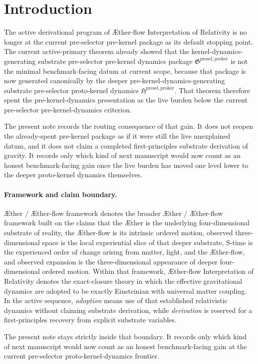 \documentclass[11pt]{article}
\newcommand{\Aether}{\AE{}ther}
\newcommand{\Aflow}{\AE{}ther-flow}
\newcommand{\TheoryName}{\Aflow{} Interpretation of Relativity}
\newcommand{\TheoryProgram}{\Aether{} / \Aflow{} framework}
\newcommand{\ProtoKernelPackage}{\mathfrak H^{\mathrm{presel,proker}}}
\newcommand{\PreKernelPackage}{\mathfrak G^{\mathrm{presel,preker}}}
\begin{document}
\section{Introduction}

The active derivational program of \TheoryName{} is no longer at the current pre-selector pre-kernel package as its default stopping point. The current active-primary theorem already showed that the kernel-dynamics-generating substrate pre-selector pre-kernel dynamics package \(\PreKernelPackage\) is not the minimal benchmark-facing datum at current scope, because that package is now generated canonically by the deeper pre-kernel-dynamics-generating substrate pre-selector proto-kernel dynamics \(\ProtoKernelPackage\). That theorem therefore spent the pre-kernel-dynamics presentation as the live burden below the current pre-selector pre-kernel-dynamics criterion.

The present note records the routing consequence of that gain. It does not reopen the already-spent pre-kernel package as if it were still the live unexplained datum, and it does not claim a completed first-principles substrate derivation of gravity. It records only which kind of next manuscript would now count as an honest benchmark-facing gain once the live burden has moved one level lower to the deeper proto-kernel dynamics themselves.

\paragraph{Framework and claim boundary.}
\TheoryProgram{} denotes the broader \Aether{} / \Aflow{} framework built on the claims that the \Aether{} is the underlying four-dimensional substrate of reality, the \Aflow{} is its intrinsic ordered motion, observed three-dimensional space is the local experiential slice of that deeper substrate, S-time is the experienced order of change arising from matter, light, and the \Aflow{}, and observed expansion is the three-dimensional appearance of deeper four-dimensional ordered motion. Within that framework, \TheoryName{} denotes the exact-closure theory in which the effective gravitational dynamics are adopted to be exactly Einsteinian with universal matter coupling. In the active sequence, \emph{adoption} means use of that established relativistic dynamics without claiming substrate derivation, while \emph{derivation} is reserved for a first-principles recovery from explicit substrate variables.

The present note stays strictly inside that boundary. It records only which kind of next manuscript would now count as an honest benchmark-facing gain at the current pre-selector proto-kernel-dynamics frontier.
\end{document}
